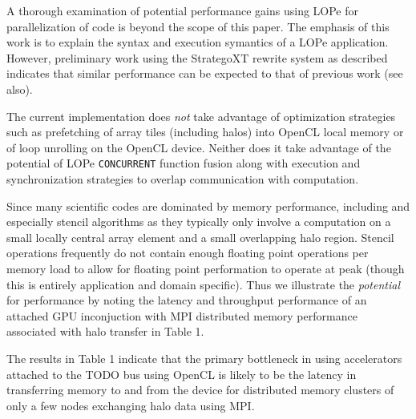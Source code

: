 A thorough examination of potential performance gains using LOPe for parallelization of code is beyond
the scope of this paper.  The emphasis of this work is to explain the syntax and execution symantics
of a LOPe application.  However, preliminary work using the StrategoXT rewrite system as described indicates
that similar performance can be expected to that of previous work\cite{foropencl} (see also\cite{StencilCompilers}).

The current implementation does \emph{not} take advantage of optimization strategies such as
prefetching of array tiles (including halos) into OpenCL local memory or of loop unrolling on the
OpenCL device.  Neither does it take advantage of the potential of LOPe \texttt{CONCURRENT} function
fusion along with execution and synchronization strategies to overlap communication with
computation.

Since many scientific codes are dominated by memory performance, including and especially stencil algorithms
as they typically only involve a computation on a small locally central array element and a small overlapping
halo region.  Stencil operations frequently do not contain enough floating point operations per memory load
to allow for floating point performation to operate at peak (though this is entirely application and domain
specific).  Thus we illustrate the \emph{potential} for performance by noting the latency and throughput
performance of an attached GPU inconjuction with MPI distributed memory performance associated with halo
transfer in Table 1.

The results in Table 1 indicate that the primary bottleneck in using accelerators attached to the
TODO bus using OpenCL is likely to be the latency in transferring memory to and from the device for
distributed memory clusters of only a few nodes exchanging halo data using MPI.
